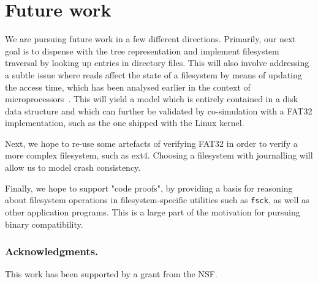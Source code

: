 \documentclass[runningheads,a4paper]{llncs}
\begin{document}
\section{Future work}

We are pursuing future work in a few different directions. Primarily,
our next goal is to dispense with the tree representation and
implement filesystem traversal by looking up entries in directory
files. This will also involve addressing a subtle issue where reads
affect the state of a filesystem by means of updating the access time,
which has been analysed earlier in the context of
microprocessors~\cite{goel2017engineering}. This will yield a model
which is entirely contained in a disk data structure and which can
further be validated by co-simulation with a FAT32 implementation,
such as the one shipped with the Linux kernel.

Next, we hope to re-use some artefacts of verifying FAT32 in order to
verify a more complex filesystem, such as ext4. Choosing a filesystem
with journalling will allow us to model crash consistency.

Finally, we hope to support "code proofs", by providing a basis for
reasoning about filesystem operations in filesystem-specific utilities
such as \texttt{fsck}, as well as other application programs. This is
a large part of the motivation for pursuing binary compatibility.

\subsubsection*{Acknowledgments.} This work has been supported by a
grant from the NSF.



\end{document}
